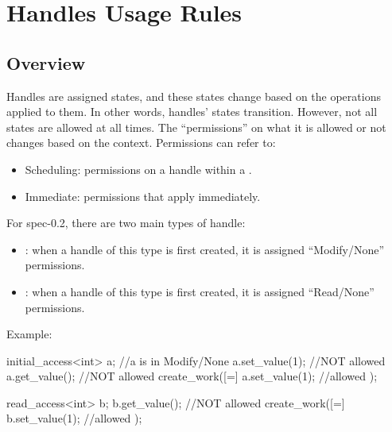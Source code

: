 
\appendix
\newcommand{\specialcell}[2][c]{%
  \begin{tabular}[#1]{@{}c@{}}#2\end{tabular}}


\chapter{Handles Usage Rules}



\section{Overview}
Handles are assigned states, and these states change 
based on the operations applied to them. In other words, 
handles' states transition. However, not all states 
are allowed at all times. The ``permissions'' on 
what it is allowed or not changes based on the 
context. 
Permissions can refer to: 
\begin{itemize}
\item Scheduling: permissions on a handle 
within a .
\item Immediate: permissions that apply immediately.
\end{itemize}

For spec-0.2, there are two main types of handle:
\begin{itemize}
\item {}: when a handle of 
this type is first created, it is assigned 
``Modify/None'' permissions.
%
\item {}: when a handle of 
this type is first created, it is assigned 
``Read/None'' permissions.
\end{itemize}


Example: 
\hspace{-0.75cm}
\begin{minipage}[t]{0.45\linewidth}%
\centering
\begin{vaspPseudo}
initial_access<int> a;
//a is in Modify/None
a.set_value(1); //NOT allowed
a.get_value();  //NOT allowed
create_work([=]
{
    a.set_value(1); //allowed
});
\end{vaspPseudo}
\end{minipage}
\hspace{0.55cm}
\begin{minipage}[t]{0.45\linewidth}
\centering
\begin{vaspPseudo}
read_access<int> b;
b.get_value(); //NOT allowed
create_work([=]
{
    b.set_value(1); //allowed
});
\end{vaspPseudo}
\end{minipage}


